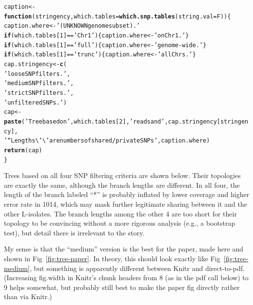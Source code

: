 \documentclass{article}\usepackage[]{graphicx}\usepackage[]{color}
\makeatletter
\newcommand{\hlnum}[1]{\textcolor[rgb]{0.686,0.059,0.569}{#1}}%
\newcommand{\hlstr}[1]{\textcolor[rgb]{0.192,0.494,0.8}{#1}}%
\newcommand{\hlopt}[1]{\textcolor[rgb]{0,0,0}{#1}}%
\newcommand{\hlstd}[1]{\textcolor[rgb]{0.345,0.345,0.345}{#1}}%
\newcommand{\hlkwa}[1]{\textcolor[rgb]{0.161,0.373,0.58}{\textbf{#1}}}%
\newcommand{\hlkwb}[1]{\textcolor[rgb]{0.69,0.353,0.396}{#1}}%
\newcommand{\hlkwc}[1]{\textcolor[rgb]{0.333,0.667,0.333}{#1}}%
\newcommand{\hlkwd}[1]{\textcolor[rgb]{0.737,0.353,0.396}{\textbf{#1}}}%
\newenvironment{kframe}{%
 \def\at@end@of@kframe{}%
 \ifinner\ifhmode%
  \def\at@end@of@kframe{\end{minipage}}%
  \begin{minipage}{\columnwidth}%
 \fi\fi%
 \def\FrameCommand##1{\hskip\@totalleftmargin \hskip-\fboxsep
 \colorbox{shadecolor}{##1}\hskip-\fboxsep
     \hskip-\linewidth \hskip-\@totalleftmargin \hskip\columnwidth}%
 \MakeFramed {\advance\hsize-\width
   \@totalleftmargin\z@ \linewidth\hsize
   \@setminipage}}%
 {\par\unskip\endMakeFramed%
 \at@end@of@kframe}
\newenvironment{knitrout}{}{} %
\makeatother
\begin{document}
\begin{knitrout}\footnotesize
{}\color{fgcolor}\begin{kframe}
\begin{alltt}
\hlstd{caption} \hlkwb{<-} \hlkwa{function}\hlstd{(}\hlkwc{stringency}\hlstd{,}\hlkwc{which.tables}\hlstd{=}\hlkwd{which.snp.tables}\hlstd{(}\hlkwc{string.val}\hlstd{=F))\{}
  \hlstd{caption.where} \hlkwb{<-} \hlstr{'(UNKNOWN genome subset).'}
  \hlkwa{if}\hlstd{(which.tables[}\hlnum{1}\hlstd{]}\hlopt{==}\hlstr{'Chr1'}\hlstd{) \{caption.where} \hlkwb{<-} \hlstr{'on Chr1.'}\hlstd{\}}
  \hlkwa{if}\hlstd{(which.tables[}\hlnum{1}\hlstd{]}\hlopt{==}\hlstr{'full'}\hlstd{) \{caption.where} \hlkwb{<-} \hlstr{'genome-wide.'}\hlstd{\}}
  \hlkwa{if}\hlstd{(which.tables[}\hlnum{1}\hlstd{]}\hlopt{==}\hlstr{'trunc'}\hlstd{)\{caption.where} \hlkwb{<-} \hlstr{'all Chrs.'}\hlstd{\}}
  \hlstd{cap.stringency} \hlkwb{<-} \hlkwd{c}\hlstd{(}
    \hlstr{'loose SNP filters.'}\hlstd{,}
    \hlstr{'medium SNP filters.'}\hlstd{,}
    \hlstr{'strict SNP filters.'}\hlstd{,}
    \hlstr{'unfiltered SNPs.'}\hlstd{)}
  \hlstd{cap} \hlkwb{<-} \hlkwd{paste}\hlstd{(}\hlstr{'Tree based on'}\hlstd{, which.tables[}\hlnum{2}\hlstd{],} \hlstr{'reads and'}\hlstd{, cap.stringency[stringency],}
               \hlstr{' ``Lengths\textbackslash{}'\textbackslash{}' are numbers of shared/private SNPs'}\hlstd{, caption.where)}
  \hlkwd{return}\hlstd{(cap)}
\hlstd{\}}
\end{alltt}
\end{kframe}
\end{knitrout}


Trees based on all four SNP filtering criteria are shown below.  Their topologies are exactly the
same, although the branch lengths are different.  In all four, the length of the branch labeled ``*'' is probably
inflated by lower coverage and higher error rate in 1014, which may mask further legitimate sharing between it and the
other L-isolates.  The branch lengths among the other 4 are too short for their topology to be convincing without a
more rigorous analysis (e.g., a bootstrap test), but detail there is irrelevant to the story.

My sense is that the ``medium'' version is the best for the paper, made here and shown in 
Fig~\ref{fig:tree-paper}.  In theory, this should look exactly like Fig~\ref{fig:tree-medium}, but 
something is apparently different between Knitr and direct-to-pdf.  (Increasing fig.width in Knitr's 
chunk headers from 8 (as in the pdf call below) to 9 helps somewhat, but probably still best to make 
the paper fig directly rather than via Knitr.)
\end{document}
